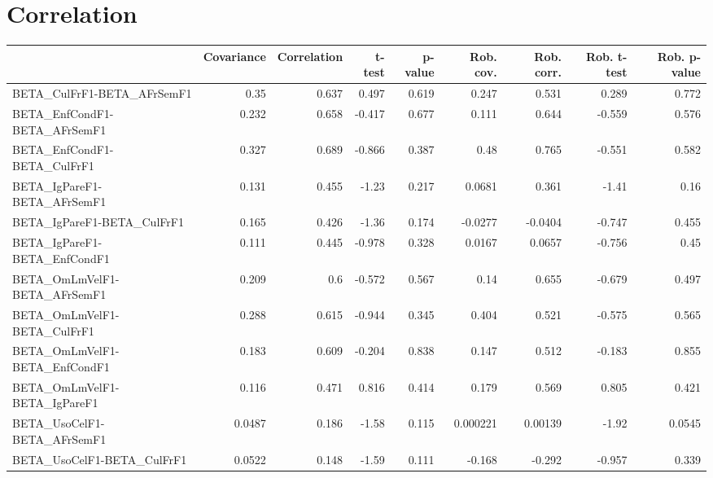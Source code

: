 \section{Correlation}
\begin{tabular}{lrrrrrrrr}
\toprule
{} &  Covariance &  Correlation &  t-test &  p-value &  Rob. cov. &  Rob. corr. &  Rob. t-test &  Rob. p-value \\
\midrule
BETA\_CulFrF1-BETA\_AFrSemF1            &        0.35 &        0.637 &   0.497 &    0.619 &      0.247 &       0.531 &        0.289 &         0.772 \\
BETA\_EnfCondF1-BETA\_AFrSemF1          &       0.232 &        0.658 &  -0.417 &    0.677 &      0.111 &       0.644 &       -0.559 &         0.576 \\
BETA\_EnfCondF1-BETA\_CulFrF1           &       0.327 &        0.689 &  -0.866 &    0.387 &       0.48 &       0.765 &       -0.551 &         0.582 \\
BETA\_IgPareF1-BETA\_AFrSemF1           &       0.131 &        0.455 &   -1.23 &    0.217 &     0.0681 &       0.361 &        -1.41 &          0.16 \\
BETA\_IgPareF1-BETA\_CulFrF1            &       0.165 &        0.426 &   -1.36 &    0.174 &    -0.0277 &     -0.0404 &       -0.747 &         0.455 \\
BETA\_IgPareF1-BETA\_EnfCondF1          &       0.111 &        0.445 &  -0.978 &    0.328 &     0.0167 &      0.0657 &       -0.756 &          0.45 \\
BETA\_OmLmVelF1-BETA\_AFrSemF1          &       0.209 &          0.6 &  -0.572 &    0.567 &       0.14 &       0.655 &       -0.679 &         0.497 \\
BETA\_OmLmVelF1-BETA\_CulFrF1           &       0.288 &        0.615 &  -0.944 &    0.345 &      0.404 &       0.521 &       -0.575 &         0.565 \\
BETA\_OmLmVelF1-BETA\_EnfCondF1         &       0.183 &        0.609 &  -0.204 &    0.838 &      0.147 &       0.512 &       -0.183 &         0.855 \\
BETA\_OmLmVelF1-BETA\_IgPareF1          &       0.116 &        0.471 &   0.816 &    0.414 &      0.179 &       0.569 &        0.805 &         0.421 \\
BETA\_UsoCelF1-BETA\_AFrSemF1           &      0.0487 &        0.186 &   -1.58 &    0.115 &   0.000221 &     0.00139 &        -1.92 &        0.0545 \\
BETA\_UsoCelF1-BETA\_CulFrF1            &      0.0522 &        0.148 &   -1.59 &    0.111 &     -0.168 &      -0.292 &       -0.957 &         0.339 \\

\end{tabular}
